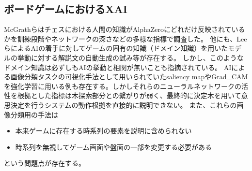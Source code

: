 \subsection{ボードゲームにおけるXAI}
McGrathら\cite{DeepMind}はチェスにおける人間の知識がAlphaZeroにどれだけ反映されているかを訓練段階やネットワークの深さなどの多様な指標で調査した。
他にも、Leeら\cite{DecodeChess}によるAIの着手に対してゲームの固有の知識（ドメイン知識）を用いたモデルの挙動に対する解説文の自動生成の試み等が存在する。
しかし、このようなドメイン知識は必ずしもAIの挙動と相関が無いことも指摘されている\cite{DeepMind}。
AIによる画像分類タスクの可視化手法として用いられていたsaliency map\cite{saliency}やGrad\_CAM\cite{Grad-CAM}を強化学習に用いる例も存在する\cite{atari-saliency}\cite{gl}\cite{visualize}。しかしそれらのニューラルネットワークの活性を根拠とした指標は木探索部分との繋がりが弱く、最終的に決定木を用いて意思決定を行うシステムの動作根拠を直接的に説明できない。
また、これらの画像分類用の手法は
\begin{itemize}
	\item 本来ゲームに存在する時系列の要素を説明に含められない
	\item 時系列を無視してゲーム画面や盤面の一部を変更する必要がある
\end{itemize}
という問題点が存在する。

